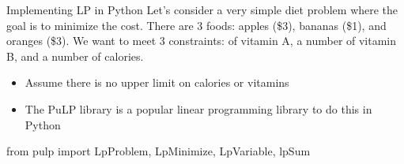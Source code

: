 \documentclass[
  ignorenonframetext,
]{beamer}
\newenvironment{Shaded}{\begin{snugshade}}{\end{snugshade}}
\newcommand{\ImportTok}[1]{\textcolor[rgb]{0.00,0.46,0.62}{#1}}
\newcommand{\NormalTok}[1]{\textcolor[rgb]{0.00,0.23,0.31}{#1}}
\begin{document}
\begin{frame}[fragile]{Implementing LP in Python}
\protect\hypertarget{implementing-lp-in-python}{}
Let's consider a very simple diet problem where the goal is to minimize
the cost. There are 3 foods: apples (\$3), bananas (\$1), and oranges
(\$3). We want to meet 3 constraints: of vitamin A, a number of vitamin
B, and a number of calories.

\begin{itemize}
\item
  Assume there is no upper limit on calories or vitamins
\item
  The PuLP library is a popular linear programming library to do this in
  Python
\end{itemize}

\begin{Shaded}
\begin{Highlighting}[]
\ImportTok{from}\NormalTok{ pulp }\ImportTok{import}\NormalTok{ LpProblem, LpMinimize, LpVariable, lpSum}
\end{Highlighting}
\end{Shaded}
\end{frame}
\end{document}
